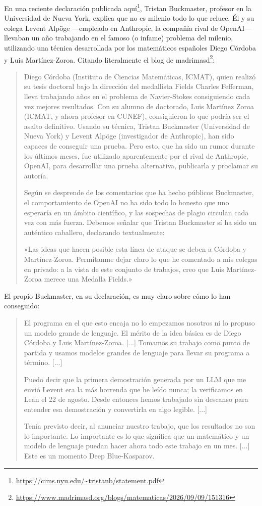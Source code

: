 \documentclass[11pt,a4paper]{article}
\begin{document}
En una reciente declaración publicada aquí\footnote{\url{https://cims.nyu.edu/~tristanb/statement.pdf}}, Tristan Buckmaster, profesor en la Universidad de Nueva York, explica que no es milenio todo lo que reluce. Él y su colega Levent Alpöge ---empleado en Anthropic, la compañía rival de OpenAI--- llevaban un año trabajando en el famoso (o infame) problema del milenio, utilizando una técnica desarrollada por los matemáticos españoles Diego Córdoba y Luis Martínez-Zoroa. Citando literalmente el blog de madrimasd\footnote{\url{https://www.madrimasd.org/blogs/matematicas/2026/09/09/151316}}:

\begin{quotation}
Diego Córdoba (Instituto de Ciencias Matemáticas, ICMAT), quien realizó su tesis doctoral bajo la dirección del medallista Fields Charles Fefferman, lleva trabajando años en el problema de Navier-Stokes consiguiendo cada vez mejores resultados. Con su alumno de doctorado, Luis Martínez Zoroa (ICMAT, y ahora profesor en CUNEF), consiguieron lo que podría ser el asalto definitivo. Usando su técnica, Tristan Buckmaster (Universidad de Nueva York) y Levent Alpöge (investigador de Anthropic), han sido capaces de conseguir una prueba. Pero esto, que ha sido un rumor durante los últimos meses, fue utilizado aparentemente por el rival de Anthropic, OpenAI, para desarrollar una prueba alternativa, publicarla y proclamar su autoría.

Según se desprende de los comentarios que ha hecho públicos Buckmaster, el comportamiento de OpenAI no ha sido todo lo honesto que uno esperaría en un ámbito científico, y las sospechas de plagio circulan cada vez con más fuerza. Debemos señalar que Tristan Buckmaster sí ha sido un auténtico caballero, declarando textualmente:

«Las ideas que hacen posible esta línea de ataque se deben a Córdoba y Martínez-Zoroa. Permítanme dejar claro lo que he comentado a mis colegas en privado: a la vista de este conjunto de trabajos, creo que Luis Martínez-Zoroa merece una Medalla Fields.»
\end{quotation}

El propio Buckmaster, en su declaración, es muy claro sobre cómo lo han conseguido:

\begin{quotation}
El programa en el que esto encaja no lo empezamos nosotros ni lo propuso un modelo grande de lenguaje. El mérito de la idea básica es de Diego Córdoba y Luis Martínez-Zoroa. [...] Tomamos su trabajo como punto de partida y usamos modelos grandes de lenguaje para llevar su programa a término. [...]

Puedo decir que la primera demostración generada por un LLM que me envió Levent era la más horrenda que he leído nunca; la verificamos en Lean el 22 de agosto. Desde entonces hemos trabajado sin descanso para entender esa demostración y convertirla en algo legible. [...]

Tenía previsto decir, al anunciar nuestro trabajo, que los resultados no son lo importante. Lo importante es lo que significa que un matemático y un modelo de lenguaje puedan hacer ahora todo este trabajo en un mes. [...] Este es un momento Deep Blue-Kasparov.
\end{quotation}
\end{document}
